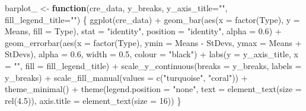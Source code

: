 \documentclass[
  letterpaper,
]{article}
\newenvironment{Shaded}{\begin{snugshade}}{\end{snugshade}}
\newcommand{\AttributeTok}[1]{\textcolor[rgb]{0.40,0.45,0.13}{#1}}
\newcommand{\ControlFlowTok}[1]{\textcolor[rgb]{0.00,0.23,0.31}{\textbf{#1}}}
\newcommand{\DecValTok}[1]{\textcolor[rgb]{0.68,0.00,0.00}{#1}}
\newcommand{\FloatTok}[1]{\textcolor[rgb]{0.68,0.00,0.00}{#1}}
\newcommand{\FunctionTok}[1]{\textcolor[rgb]{0.28,0.35,0.67}{#1}}
\newcommand{\NormalTok}[1]{\textcolor[rgb]{0.00,0.23,0.31}{#1}}
\newcommand{\OtherTok}[1]{\textcolor[rgb]{0.00,0.23,0.31}{#1}}
\newcommand{\SpecialCharTok}[1]{\textcolor[rgb]{0.37,0.37,0.37}{#1}}
\newcommand{\StringTok}[1]{\textcolor[rgb]{0.13,0.47,0.30}{#1}}
\begin{document}
\begin{Shaded}
\begin{Highlighting}[]
\NormalTok{barplot\_ }\OtherTok{\textless{}{-}} \ControlFlowTok{function}\NormalTok{(cre\_data, y\_breaks, }\AttributeTok{y\_axis\_title=}\StringTok{""}\NormalTok{,}
                     \AttributeTok{fill\_legend\_title=}\StringTok{""}\NormalTok{) \{}
  \FunctionTok{ggplot}\NormalTok{(cre\_data) }\SpecialCharTok{+}
    \FunctionTok{geom\_bar}\NormalTok{(}\FunctionTok{aes}\NormalTok{(}\AttributeTok{x =} \FunctionTok{factor}\NormalTok{(Type), }
                 \AttributeTok{y =}\NormalTok{ Means, }\AttributeTok{fill =}\NormalTok{ Type),}
             \AttributeTok{stat =} \StringTok{"identity"}\NormalTok{, }\AttributeTok{position =} \StringTok{"identity"}\NormalTok{,}
             \AttributeTok{alpha =} \FloatTok{0.6}\NormalTok{) }\SpecialCharTok{+}
    \FunctionTok{geom\_errorbar}\NormalTok{(}\FunctionTok{aes}\NormalTok{(}\AttributeTok{x =} \FunctionTok{factor}\NormalTok{(Type), }
                      \AttributeTok{ymin =}\NormalTok{ Means }\SpecialCharTok{{-}}\NormalTok{ StDevs,}
                      \AttributeTok{ymax =}\NormalTok{ Means }\SpecialCharTok{+}\NormalTok{ StDevs),}
                  \AttributeTok{alpha =} \FloatTok{0.6}\NormalTok{, }\AttributeTok{width =} \FloatTok{0.5}\NormalTok{,}
                  \AttributeTok{colour =} \StringTok{"black"}\NormalTok{) }\SpecialCharTok{+}
    \FunctionTok{labs}\NormalTok{(}\AttributeTok{y =}\NormalTok{ y\_axis\_title, }\AttributeTok{x =} \StringTok{""}\NormalTok{,}
         \AttributeTok{fill =}\NormalTok{ fill\_legend\_title) }\SpecialCharTok{+}
    \FunctionTok{scale\_y\_continuous}\NormalTok{(}\AttributeTok{breaks =}\NormalTok{ y\_breaks,}
                       \AttributeTok{labels =}\NormalTok{ y\_breaks) }\SpecialCharTok{+}
    \FunctionTok{scale\_fill\_manual}\NormalTok{(}\AttributeTok{values =} \FunctionTok{c}\NormalTok{(}\StringTok{"turquoise"}\NormalTok{, }\StringTok{"coral"}\NormalTok{)) }\SpecialCharTok{+}
    \FunctionTok{theme\_minimal}\NormalTok{() }\SpecialCharTok{+}
    \FunctionTok{theme}\NormalTok{(}\AttributeTok{legend.position =} \StringTok{"none"}\NormalTok{,}
          \AttributeTok{text =} \FunctionTok{element\_text}\NormalTok{(}\AttributeTok{size =} \FunctionTok{rel}\NormalTok{(}\FloatTok{4.5}\NormalTok{)),}
          \AttributeTok{axis.title =} \FunctionTok{element\_text}\NormalTok{(}\AttributeTok{size =} \DecValTok{16}\NormalTok{))}
\NormalTok{\}}


\end{Highlighting}
\end{Shaded}
\end{document}
